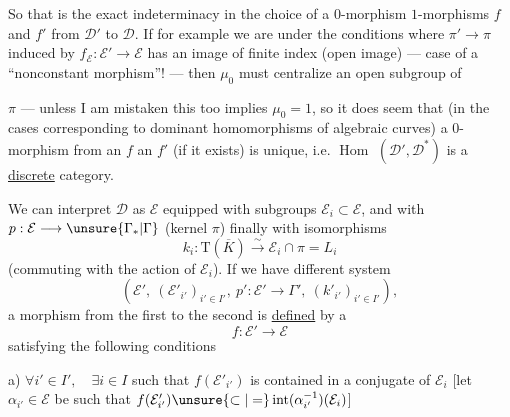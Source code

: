 So that is the exact indeterminacy in the choice of a $0$-morphism  $1$-morphisms  $f$ and $f'$ from $\mathcal D'$ to $\mathcal D$.
If for example we are under the conditions where
$\pi'\longrightarrow\pi$ induced by $f_{\mathcal E}:\mathcal E'\longrightarrow\mathcal E$  has an image of finite index (open image)
--- case of a ``nonconstant morphism''! ---
then $\mu_0$ must centralize an open subgroup of

$\pi$ --- unless I am mistaken this too implies $\mu_0=1$, so it does seem that  (in the cases corresponding to dominant homomorphisms of algebraic curves) a  $0$-morphism from an $f$  an $f'$ (if it exists) is unique, i.e. \uline{$\operatorname{Hom}$} $(\mathcal D',\mathcal D^*)$ is a \uline{discrete} category.

We can interpret $\mathcal D$ as $\mathcal E$ equipped with subgroups $\mathcal E_i\subset\mathcal E$, and with $p:\mathcal E\longrightarrow\unsure{\Gamma_*|\Gamma}$ (kernel $\pi$) finally with isomorphisms
\[
k_i:\mathrm T(\overline K)\xrightarrow{\sim}\mathcal E_i\cap\pi=L_i
\]
(commuting with the action of $\mathcal E_i$).
If we have  different system
\[
(\mathcal E',\ (\mathcal E'_{i'})_{i'\in I'},\ p':\mathcal E'\longrightarrow\Gamma',\ (k'_{i'})_{i'\in I'}),
\]
a morphism from the first to the second is \uline{defined} by a
\[
f:\mathcal E'\longrightarrow\mathcal E
\]
satisfying the following conditions


a) $\forall i'\in I',\quad\exists i\in I$ such that $f(\mathcal E'_{i'})$ is contained in a conjugate of $\mathcal E_i$
[let $\alpha_{i'}\in\mathcal E$ be such that
$f(\mathcal E'_{i'})\unsure{\subset|=}\operatorname{int}(\alpha_{i'}^{-1})(\mathcal E_i)$]

